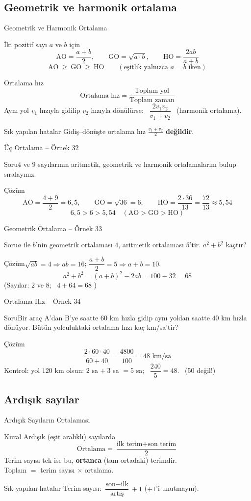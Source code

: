 \documentclass[aspectratio=169,11pt,handout]{beamer}
\newcommand{\soru}[3]{%
\begin{frame}{#1}
  \begin{block}{Soru}\large #2\end{block}
  \pause
  \begin{exampleblock}{Çözüm}\large #3\end{exampleblock}
\end{frame}}
\begin{document}
\subsection{Geometrik ve harmonik ortalama}
\begin{frame}{Geometrik ve Harmonik Ortalama}
\begin{block}{İki pozitif sayı \(a\) ve \(b\) için}
\[\text{AO}=\frac{a+b}{2},\qquad \text{GO}=\sqrt{a\cdot b},\qquad \text{HO}=\frac{2ab}{a+b}\]
\[\text{AO}\ \ge\ \text{GO}\ \ge\ \text{HO}\qquad(\text{eşitlik yalnızca } a=b \text{ iken})\]
\end{block}
\begin{block}{Ortalama hız}
\[\text{Ortalama hız}=\frac{\text{Toplam yol}}{\text{Toplam zaman}}\]
Aynı yol \(v_1\) hızıyla gidilip \(v_2\) hızıyla dönülürse: \ \(\dfrac{2v_1v_2}{v_1+v_2}\) \ (harmonik ortalama).
\end{block}
\begin{alertblock}{Sık yapılan hatalar}
Gidiş--dönüşte ortalama hız \(\frac{v_1+v_2}{2}\) \textbf{değildir}.
\end{alertblock}
\end{frame}

\soru{Üç Ortalama -- Örnek 32}
{\(4\) ve \(9\) sayılarının aritmetik, geometrik ve harmonik ortalamalarını bulup sıralayınız.}
{\[\text{AO}=\frac{4+9}{2}=6{,}5,\qquad \text{GO}=\sqrt{36}=6,\qquad \text{HO}=\frac{2\cdot 36}{13}=\frac{72}{13}\approx 5{,}54\]
\[6{,}5>6>5{,}54\quad(\text{AO}>\text{GO}>\text{HO})\]}

\soru{Geometrik Ortalama -- Örnek 33}
{\(a\) ile \(b\)'nin geometrik ortalaması \(4\), aritmetik ortalaması \(5\)'tir. \(a^2+b^2\) kaçtır?}
{\(\sqrt{ab}=4\Rightarrow ab=16\); \quad \(\dfrac{a+b}{2}=5\Rightarrow a+b=10\).
\[a^2+b^2=(a+b)^2-2ab=100-32=68\]
(Sayılar: \(2\) ve \(8\); \ \(4+64=68\) \checkmark)}

\soru{Ortalama Hız -- Örnek 34}
{Bir araç A'dan B'ye saatte \(60\) km hızla gidip aynı yoldan saatte \(40\) km hızla dönüyor. Bütün yolculuktaki ortalama hızı kaç km/sa'tir?}
{\[\frac{2\cdot 60\cdot 40}{60+40}=\frac{4800}{100}=48\text{ km/sa}\]
Kontrol: yol \(120\) km olsun: \(2\) sa \(+\ 3\) sa \(=5\) sa; \ \(\dfrac{240}{5}=48\). \ (\(50\) değil!)}

\subsection{Ardışık sayılar}
\begin{frame}{Ardışık Sayıların Ortalaması}
\begin{block}{Kural}
Ardışık (eşit aralıklı) sayılarda
\[\text{Ortalama}=\frac{\text{ilk terim}+\text{son terim}}{2}\]
Terim sayısı tek ise bu, \textbf{ortanca} (tam ortadaki) terimdir.\\[2pt]
Toplam \(=\) terim sayısı \(\times\) ortalama.
\end{block}
\begin{alertblock}{Sık yapılan hatalar}
Terim sayısı: \(\dfrac{\text{son}-\text{ilk}}{\text{artış}}+1\) \quad (\(+1\)'i unutmayın).
\end{alertblock}
\end{frame}
\end{document}
